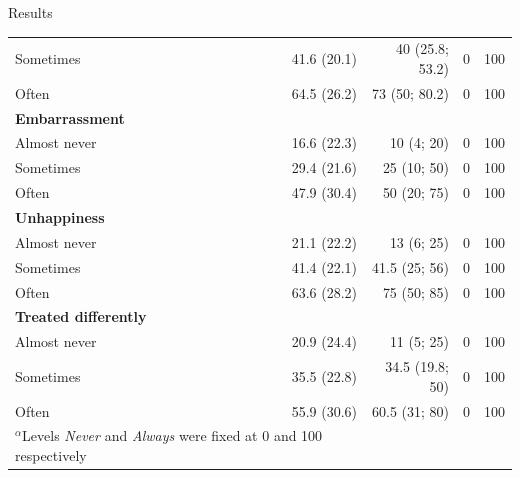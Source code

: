 \documentclass[t,compress,9pt,aspectratio=169]{beamer}
\begin{document}
\begin{frame}{Results}
{\begin{table}[h]
\begin{tabular}{lrrrr}
   \quad Sometimes & 41.6 (20.1) & 40 (25.8; 53.2) & 0 & 100 \\
   \quad Often & 64.5 (26.2) & 73 (50; 80.2) & 0 & 100 \\
   \textbf{Embarrassment} &  &  &  &  \\
   \quad Almost never & 16.6 (22.3) & 10 (4; 20) & 0 & 100 \\
   \quad Sometimes & 29.4 (21.6) & 25 (10; 50) & 0 & 100 \\
   \quad Often & 47.9 (30.4) & 50 (20; 75) & 0 & 100 \\
   \textbf{Unhappiness} &  &  &  &  \\
   \quad Almost never & 21.1 (22.2) & 13 (6; 25) & 0 & 100 \\
   \quad Sometimes & 41.4 (22.1) & 41.5 (25; 56) & 0 & 100 \\
   \quad Often & 63.6 (28.2) & 75 (50; 85) & 0 & 100 \\
   \textbf{Treated differently} &  &  &  &  \\
   \quad Almost never & 20.9 (24.4) & 11 (5; 25) & 0 & 100 \\
   \quad Sometimes & 35.5 (22.8) & 34.5 (19.8; 50) & 0 & 100 \\
   \quad Often & 55.9 (30.6) & 60.5 (31; 80) & 0 & 100 \\
   \hline
   \multicolumn{2}{l}{\(^\alpha\)Levels \textit{Never} and \textit{Always} were fixed at 0 and 100 respectively} \\   
\end{tabular}
\end{table}
}
\end{frame}
\end{document}
